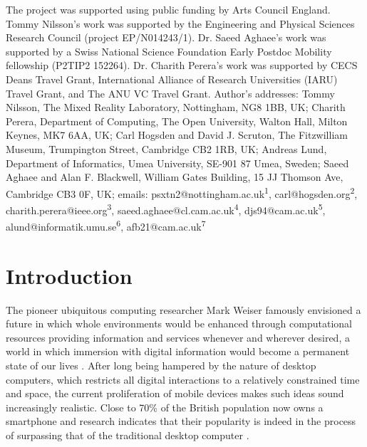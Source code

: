 \documentclass[prodmode,acmtomm]{acmsmall}
\begin{document}









\maketitle

\begin{bottomstuff}
The project was supported using public funding by Arts Council England. Tommy Nilsson's work was supported by the Engineering and Physical Sciences Research Council (project EP/N014243/1). Dr. Saeed Aghaee's work was supported by a Swiss National Science Foundation Early Postdoc Mobility fellowship (P2TIP2 152264). Dr. Charith Perera's work was supported by CECS Deans Travel Grant, International Alliance of Research Universities (IARU) Travel Grant, and The ANU VC Travel Grant. 
Author's addresses: Tommy Nilsson, The Mixed Reality Laboratory, Nottingham, NG8 1BB, UK; Charith Perera, Department of Computing, The Open University, Walton Hall, Milton Keynes, MK7 6AA, UK; Carl Hogsden and David J. Scruton, The Fitzwilliam Museum, Trumpington Street, Cambridge CB2 1RB, UK; Andreas Lund, Department of Informatics, Umea University, SE-901 87 Umea, Sweden; Saeed Aghaee and Alan F. Blackwell, William Gates Building, 15 JJ Thomson Ave, Cambridge CB3 0F, UK;
emails: 
psxtn2@nottingham.ac.uk\textsuperscript{1}, carl@hogsden.org\textsuperscript{2}, charith.perera@ieee.org\textsuperscript{3}, saeed.aghaee@cl.cam.ac.uk\textsuperscript{4}, djs94@cam.ac.uk\textsuperscript{5}, alund@informatik.umu.se\textsuperscript{6}, afb21@cam.ac.uk\textsuperscript{7}
\end{bottomstuff}

\section{Introduction}

The pioneer ubiquitous computing researcher Mark Weiser famously envisioned a future in which whole environments would be enhanced through computational resources providing information and services whenever and wherever desired, a world in which immersion with digital information would become a permanent state of our lives \cite{weiser1991}. After long being hampered by the nature of desktop computers, which restricts all digital interactions to a relatively constrained time and space, the current proliferation of mobile devices makes such ideas sound increasingly realistic. Close to 70\% of the British population now owns a smartphone \cite{styles2013} and research indicates that their popularity is indeed in the process of surpassing that of the traditional desktop computer \cite{busching2012}.
\end{document}
